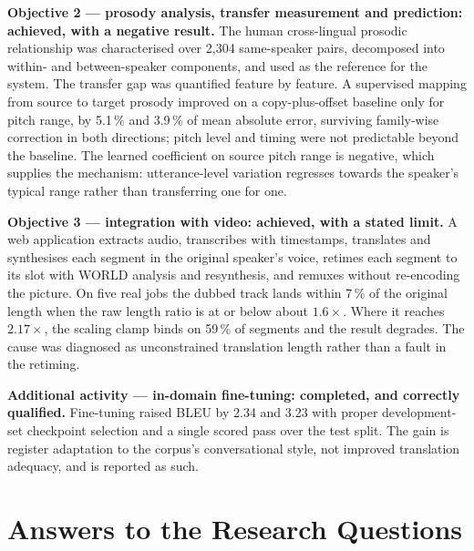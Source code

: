 \textbf{Objective 2 --- prosody analysis, transfer measurement and prediction: achieved, with a
negative result.} The human cross-lingual prosodic relationship was characterised over 2{,}304
same-speaker pairs, decomposed into within- and between-speaker components, and used as the
reference for the system. The transfer gap was quantified feature by feature. A supervised mapping
from source to target prosody improved on a copy-plus-offset baseline only for pitch range, by
5.1\,\% and 3.9\,\% of mean absolute error, surviving family-wise correction in both directions;
pitch level and timing were not predictable beyond the baseline. The learned coefficient on source
pitch range is negative, which supplies the mechanism: utterance-level variation regresses towards
the speaker's typical range rather than transferring one for one.

\textbf{Objective 3 --- integration with video: achieved, with a stated limit.} A web application
extracts audio, transcribes with timestamps, translates and synthesises each segment in the
original speaker's voice, retimes each segment to its slot with WORLD analysis and resynthesis, and
remuxes without re-encoding the picture. On five real jobs the dubbed track lands within 7\,\% of
the original length when the raw length ratio is at or below about $1.6\times$. Where it reaches
$2.17\times$, the scaling clamp binds on 59\,\% of segments and the result degrades. The cause was
diagnosed as unconstrained translation length rather than a fault in the retiming.

\textbf{Additional activity --- in-domain fine-tuning: completed, and correctly qualified.}
Fine-tuning raised BLEU by 2.34 and 3.23 with proper development-set checkpoint selection and a
single scored pass over the test split. The gain is register adaptation to the corpus's
conversational style, not improved translation adequacy, and is reported as such.

\section{Answers to the Research Questions}
\label{sec:answers}


